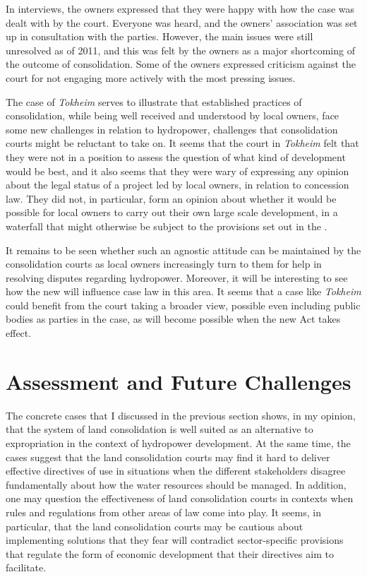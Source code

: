 In interviews, the owners expressed that they were happy with how the case was dealt with by the court. Everyone was heard, and the owners' association was set up in consultation with the parties. However, the main issues were still unresolved as of 2011, and this was felt by the owners as a major shortcoming of the outcome of consolidation. Some of the owners expressed criticism against the court for not engaging more actively with the most pressing issues.

The case of \emph{Tokheim} serves to illustrate that established practices of consolidation, while being well received and understood by local owners, face some new challenges in relation to hydropower, challenges that consolidation courts might be reluctant to take on. It seems that the court in \emph{Tokheim} felt that they were not in a position to assess the question of what kind of development would be best, and it also seems that they were wary of expressing any opinion about the legal status of a project led by local owners, in relation to concession law. They did not, in particular, form an opinion about whether it would be possible for local owners to carry out their own large scale development, in a waterfall that might otherwise be subject to the provisions set out in the \cite{ica17}.

It remains to be seen whether such an agnostic attitude can be maintained by the consolidation courts as local owners increasingly turn to them for help in resolving disputes regarding hydropower. Moreover, it will be interesting to see how the new \cite{lca13} will influence case law in this area. It seems that a case like \emph{Tokheim} could benefit from the court taking a broader view, possible even including public bodies as parties in the case, as will become possible when the new Act takes effect.

\section{Assessment and Future Challenges}\label{sec:lca}

The concrete cases that I discussed in the previous section shows, in my opinion, that the system of land consolidation is well suited as an alternative to expropriation in the context of hydropower development. At the same time, the cases suggest that the land consolidation courts may find it hard to deliver effective directives of use in situations when the different stakeholders disagree fundamentally about how the water resources should be managed. In addition, one may question the effectiveness of land consolidation courts in contexts when rules and regulations from other areas of law come into play. It seems, in particular, that the land consolidation courts may be cautious about implementing solutions that they fear will contradict sector-specific provisions that regulate the form of economic development that their directives aim to facilitate.

